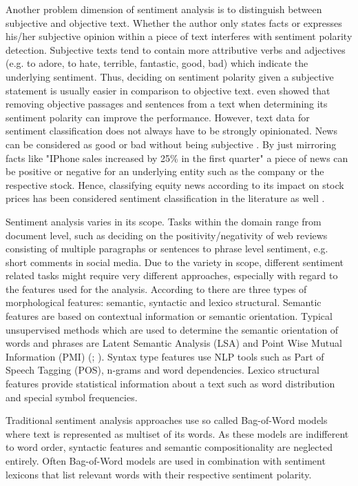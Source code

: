 \documentclass[a4paper,12pt]{article}%
\begin{document}
Another problem dimension of sentiment analysis is to distinguish between subjective and objective text. Whether the author only states facts or expresses his/her subjective opinion within a piece of text interferes with sentiment polarity detection. Subjective texts tend to contain more attributive verbs and adjectives (e.g. to adore, to hate, terrible, fantastic, good, bad) which indicate the underlying sentiment. Thus, deciding on sentiment polarity given a subjective statement is usually easier in comparison to objective text. \citet{Pang2004} even showed that removing objective passages and sentences from a text when determining its sentiment polarity can improve the performance.
However, text data for sentiment classification does not always have to be strongly opinionated. News can be considered as good or bad without being subjective \citep{Pang.2008}. By just mirroring facts like "IPhone sales increased by 25\% in the first quarter" a piece of news can be positive or negative for an underlying entity such as the company or the respective stock. Hence, classifying equity news according to its impact on stock prices has been considered sentiment classification in the literature as well \citep{Koppel2006}.

Sentiment analysis varies in its scope. Tasks within the domain range from document level, such as deciding on the positivity/negativity of web reviews consisting of multiple paragraphs or sentences to phrase level sentiment, e.g. short comments in social media. Due to the variety in scope, different sentiment related tasks might require very different approaches, especially with regard to the features used for the analysis. According to \citet{Asghar2014} there are three types of morphological features: semantic,  syntactic and lexico structural. Semantic features are based on contextual information or semantic orientation. Typical unsupervised methods which are used to determine the semantic orientation of words and phrases are Latent Semantic Analysis (LSA) and Point Wise Mutual Information (PMI) (\cite{Turney2002}; \cite{Turney2003}). Syntax type features use NLP tools such as Part of Speech Tagging (POS), n-grams and word dependencies. Lexico structural features provide statistical information about a text such as word distribution and special symbol frequencies.


Traditional sentiment analysis approaches use so called Bag-of-Word models where text is represented as multiset of its words. As these models are indifferent to word order, syntactic features and semantic compositionality are neglected entirely. Often Bag-of-Word models are used in combination with sentiment lexicons that list relevant words with their respective sentiment polarity.
\end{document}
